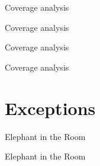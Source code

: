 \documentclass[aspectratio=169,notes]{beamer}
\begin{document}
	\begin{frame}[fragile]{Coverage analysis}
		
	\end{frame}

	\begin{frame}[fragile]{Coverage analysis}
		
	\end{frame}

	\begin{frame}[fragile]{Coverage analysis}
		
	\end{frame}

	\begin{frame}[fragile]{Coverage analysis}
		
	\end{frame}

	\section{Exceptions}
	{
	\begin{frame}[fragile]{Elephant in the Room}
	\end{frame}
	}

	\begin{frame}[fragile]{Elephant in the Room}
		
	\end{frame}
\end{document}
